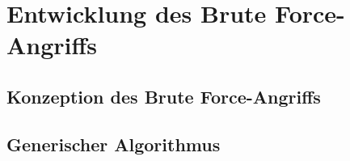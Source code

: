 \chapter{Entwicklung des Brute Force-Angriffs}

\section{Konzeption des Brute Force-Angriffs}

\section{Generischer Algorithmus}